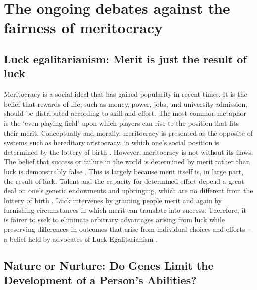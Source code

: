 \section{The ongoing debates against the fairness of meritocracy}
\subsection{Luck egalitarianism: Merit is just the result of luck}

Meritocracy is a social ideal that has gained popularity in recent times. It is the belief that rewards of life, such as money, power, jobs, and university admission, should be distributed according to skill and effort. The most common metaphor is the ‘even playing field’ upon which players can rise to the position that fits their merit. Conceptually and morally, meritocracy is presented as the opposite of systems such as hereditary aristocracy, in which one's social position is determined by the lottery of birth \citep{mark2020belief}. However, meritocracy is not without its flaws. The belief that success or failure in the world is determined by merit rather than luck is demonstrably false \citep{mark2020belief}. This is largely because merit itself is, in large part, the result of luck. Talent and the capacity for determined effort depend a great deal on one’s genetic endowments and upbringing, which are no different from the lottery of birth \citep{mark2020belief}. Luck intervenes by granting people merit and again by furnishing circumstances in which merit can translate into success. Therefore, it is fairer to seek to eliminate arbitrary advantages arising from luck while preserving differences in outcomes that arise from individual choices and efforts – a belief held by advocates of Luck Egalitarianism \citep{knight2013luck}.

\subsection{Nature or Nurture: Do Genes Limit the Development of a Person's Abilities?}

